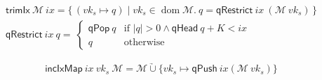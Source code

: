 \documentclass[11pt,a4paper]{article}
\DeclareMathOperator{\dom}{dom}
\newcommand\Set[2]{\{\,#1\mid#2\,\}}
\newcommand{\unionoverride}{\mathbin{\underrightarrow\cup}}
\newcommand{\var}[1]{\mathit{#1}}
\newcommand{\fun}[1]{\mathsf{#1}}
\newcommand{\size}[1]{\left| #1 \right|}
\newcommand{\signmapname}{\mathcal{M}}
\newcommand{\trimixname}{trimIx}
\newcommand{\incixmapname}{incIxMap}
\newcommand{\qrestrname}{qRestrict}
\newcommand{\qpopname}{qPop}
\newcommand{\qheadname}{qHead}
\newcommand{\qpushname}{qPush}
\newcommand{\signmap}[1]{\fun{\signmapname} ~ #1}
\newcommand{\qrestr}[2]{\fun{\qrestrname} ~ #1 ~ #2}
\newcommand{\trimix}[2]{\fun{\trimixname} ~ #1 ~ #2}
\newcommand{\incixmap}[3]{\fun{\incixmapname} ~ #1 ~ #2 ~ #3}
\newcommand{\qpop}[1]{\fun{\qpopname} ~ #1}
\newcommand{\qhead}[1]{\fun{\qheadname} ~ #1}
\newcommand{\qpush}[1]{\fun{\qpushname} ~ #1}
\newcommand{\partialf}{\mapsto}
\begin{document}
\begin{align}
  \label{eq:trimix}
  \trimix{\signmapname}{\var{ix}} = \Set{(\var{vk_s} \partialf q)}{\var{vk_s} \in \dom \signmapname.~
  q = \qrestr{\var{ix}}{(\signmap{\var{vk_s}}})} \\
  \qrestr{\var{ix}}{q} = \
  \begin{cases}
    \qpop{q} & \text{if } \size{q} > 0 \wedge \qhead{q} + K < \var{ix} \\
    q & \text{otherwise}
  \end{cases}
\end{align}

\begin{equation}
  \label{eq:incixmap}
  \incixmap{\var{ix}}{\var{vk_s}}{\signmapname} = \signmapname \unionoverride \{\var{vk_s} \partialf \qpush{\var{ix}}{(\signmap{\var{vk_s}})}\}
\end{equation}
\end{document}
